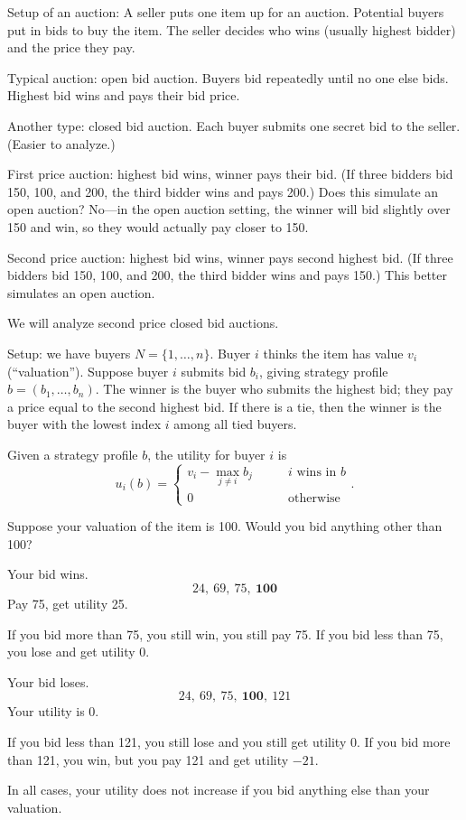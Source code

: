 \documentclass[12pt,letterpaper]{report}
\begin{document}
Setup of an auction: A seller puts one item up for an auction.
Potential buyers put in bids to buy the item.
The seller decides who wins (usually highest bidder) and the price they pay.

Typical auction: open bid auction.
Buyers bid repeatedly until no one else bids.
Highest bid wins and pays their bid price.

Another type: closed bid auction.
Each buyer submits one secret bid to the seller.
(Easier to analyze.)

First price auction: highest bid wins, winner pays their bid.
(If three bidders bid 150, 100, and 200, the third bidder wins and pays 200.)
Does this simulate an open auction?
No---in the open auction setting, the winner will bid slightly over 150 and win, so they would
actually pay closer to 150.

Second price auction: highest bid wins, winner pays second highest bid.
(If three bidders bid 150, 100, and 200, the third bidder wins and pays 150.)
This better simulates an open auction.

We will analyze second price closed bid auctions.

Setup: we have buyers $N = \{ 1, \ldots, n \}$.
Buyer $i$ thinks the item has value $v_i$ (``valuation'').
Suppose buyer $i$ submits bid $b_i$, giving strategy profile $b = (b_1, \ldots, b_n)$.
The winner is the buyer who submits the highest bid; they pay a price equal to the second highest
bid.
If there is a tie, then the winner is the buyer with the lowest index $i$ among all tied buyers.

Given a strategy profile $b$, the utility for buyer $i$ is
\[
  u_i(b) = \begin{cases}
    v_i - \displaystyle\max_{j \neq i} b_j \qquad & i \text{ wins in } b \\
    0 & \text{otherwise}
  \end{cases}.
\]

Suppose your valuation of the item is 100.
Would you bid anything other than 100?
\begin{enumcase}
  \item
    Your bid wins.
    \[
      24, \ 69, \ 75, \ \mathbf{100}
    \]
    Pay 75, get utility 25.

    If you bid more than 75, you still win, you still pay 75.
    If you bid less than 75, you lose and get utility 0.
  \item
    Your bid loses.
    \[
      24, \ 69, \ 75, \ \mathbf{100}, \ 121
    \]
    Your utility is 0.

    If you bid less than 121, you still lose and you still get utility 0.
    If you bid more than 121, you win, but you pay 121 and get utility $-21$.
\end{enumcase}
In all cases, your utility does not increase if you bid anything else than your valuation.
\end{document}
